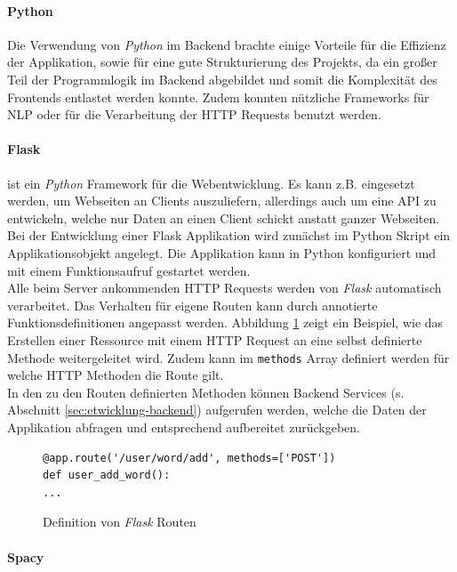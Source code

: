 \paragraph{Python}
\label{sec:python}

Die Verwendung von \textit{Python}\cite{vanRossum2011} im Backend brachte einige Vorteile für die Effizienz der Applikation, sowie für eine gute Strukturierung des Projekts, da ein großer Teil der Programmlogik im Backend abgebildet und somit die Komplexität des Frontends entlastet werden konnte. Zudem konnten nützliche Frameworks für NLP oder für die Verarbeitung der HTTP Requests benutzt werden.

\paragraph{Flask}
\label{sec:flask}

ist ein \textit{Python} Framework für die Webentwicklung. Es kann z.B. eingesetzt werden, um Webseiten an Clients auszuliefern, allerdings auch um eine API zu entwickeln, welche nur Daten an einen Client schickt anstatt ganzer Webseiten\cite{Grinberg:2014:FWD:2621997}. Bei der Entwicklung einer Flask Applikation wird zunächst im Python Skript ein Applikationsobjekt angelegt. Die Applikation kann in Python konfiguriert und mit einem Funktionsaufruf gestartet werden.\\
Alle beim Server ankommenden HTTP Requests werden von \textit{Flask} automatisch verarbeitet. Das Verhalten für eigene Routen kann durch annotierte Funktionsdefinitionen angepasst werden. Abbildung \ref{fig:flask} zeigt ein Beispiel, wie das Erstellen einer Ressource mit einem HTTP Request an eine selbst definierte Methode weitergeleitet wird. Zudem kann im \texttt{methods} Array definiert werden für welche HTTP Methoden die Route gilt.\\
In den zu den Routen definierten Methoden können Backend Services (s. Abschnitt \ref{sec:etwicklung-backend}) aufgerufen werden, welche die Daten der Applikation abfragen und entsprechend aufbereitet zurückgeben. 

\begin{figure}
	\begin{lstlisting}
@app.route('/user/word/add', methods=['POST'])
def user_add_word():
...
	\end{lstlisting}
	\caption{Definition von \textit{Flask} Routen}
	\label{fig:flask}
\end{figure}

\paragraph{Spacy}
\label{sec:spacy}


